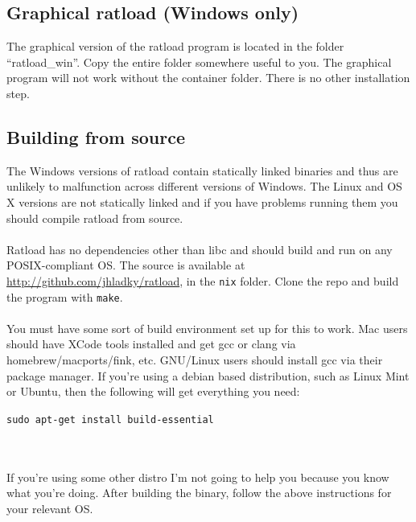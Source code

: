 \documentclass[notitlepage]{article}
\begin{document}
\subsection{Graphical ratload (Windows only)}
The graphical version of the ratload program is located in the folder ``ratload\_win''. Copy the entire folder somewhere useful to you. The graphical program will not work without the container folder. There is no other installation step.

\subsection{Building from source}
\label{sec:source_build}
The Windows versions of ratload contain statically linked binaries and thus are unlikely to malfunction across different versions of Windows. The Linux and OS X versions are not statically linked and if you have problems running them you should compile ratload from source.\\\\
Ratload has no dependencies other than libc and should build and run on any POSIX-compliant OS. The source is available at \url{http://github.com/jhladky/ratload}, in the \texttt{nix} folder. Clone the repo and build the program with \texttt{make}.\\\\
You must have some sort of build environment set up for this to work. Mac users should have XCode tools installed and get gcc or clang via homebrew/macports/fink, etc. GNU/Linux users should install gcc via their package manager. If you're using a debian based distribution, such as Linux Mint or Ubuntu, then the following will get everything you need:\\
\centerline{\texttt{sudo apt-get install build-essential}}\\\\
If you're using some other distro I'm not going to help you because you know what you're doing. After building the binary, follow the above instructions for your relevant OS.
\end{document}
